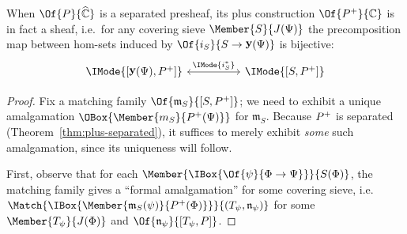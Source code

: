 \documentclass{article}
\DeclareMathOperator\OpYoneda{\mathbf{y}}
\newcommand\Yoneda[1]{\OpYoneda({#1})}
\newcommand\Psh[1]{\widehat{#1}}
\begin{document}

\begin{thm}\label{thm:plus-sheaf}
  When $\Of{P}{\Psh{\mathbb{C}}}$ is a separated presheaf, its plus
  construction $\Of{\Plus{P}}{\mathbb{C}}$ is in fact a sheaf, i.e.\
  for any covering sieve $\Member{S}{J(\Psi)}$ the precomposition map
  between hom-sets induced by $\Of{i_S}{S\to\Yoneda{\Psi}}$ is
  bijective:
  \[
    \begin{tikzcd}[sep=huge]
      \IMode{[\Yoneda{\Psi},\Plus{P}]}
      \arrow[r,leftrightarrow,"\IMode{i_S^*}"]
      &
      \IMode{[S,\Plus{P}]}
    \end{tikzcd}
  \]
\end{thm}
\begin{proof}
  Fix a matching family $\Of{\mathfrak{m}_S}{[S,\Plus{P}]}$; we need
  to exhibit a unique amalgamation
  $\OBox{\Member{m_S}{\Plus{P}(\Psi)}}$ for $\mathfrak{m}_S$.
  Because ${P}^+$ is separated (Theorem~\ref{thm:plus-separated}),
  it suffices to merely exhibit \emph{some} such amalgamation, since
  its uniqueness will follow.

  First, observe that for each
  $\Member{\IBox{\Of{\psi}{\Phi\to\Psi}}}{S(\Phi)}$, the matching
  family gives a ``formal amalgamation'' for some covering sieve,
  i.e.\
  $\Match{\IBox{\Member{\mathfrak{m}_S(\psi)}{\Plus{P}(\Phi)}}}{(T_\psi,\mathfrak{n}_\psi)}$
  for some $\Member{T_\psi}{J(\Phi)}$ and
  $\Of{\mathfrak{n}_\psi}{[T_\psi,P]}$.
  

\end{proof}
\end{document}
